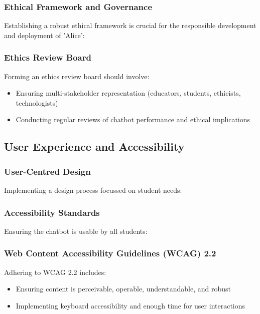 \documentclass[14pt,a4paper]{article}
\begin{document}
\begin{multicols}{2}
\subsubsection{Ethical Framework and Governance}
Establishing a robust ethical framework is crucial for the responsible development and deployment of 'Alice':

\subsubsection*{Ethics Review Board}
Forming an ethics review board \textit{\parencite{UNESCO2023}} should involve:
\begin{itemize}
    \item Ensuring multi-stakeholder representation (educators, students, ethicists, technologists)
    \item Conducting regular reviews of chatbot performance and ethical implications
\end{itemize}


\subsection{User Experience and Accessibility}
\subsubsection{User-Centred Design}
Implementing a design process focussed on student needs:


\subsubsection{Accessibility Standards}
Ensuring the chatbot is usable by all students:

\subsubsection{Web Content Accessibility Guidelines (WCAG) 2.2}
Adhering to WCAG 2.2 \textit{\parencite{W3C2023}} includes:
\begin{itemize}
    \item Ensuring content is perceivable, operable, understandable, and robust
    \item Implementing keyboard accessibility and enough time for user interactions
\end{itemize}



\end{multicols}
\end{document}
